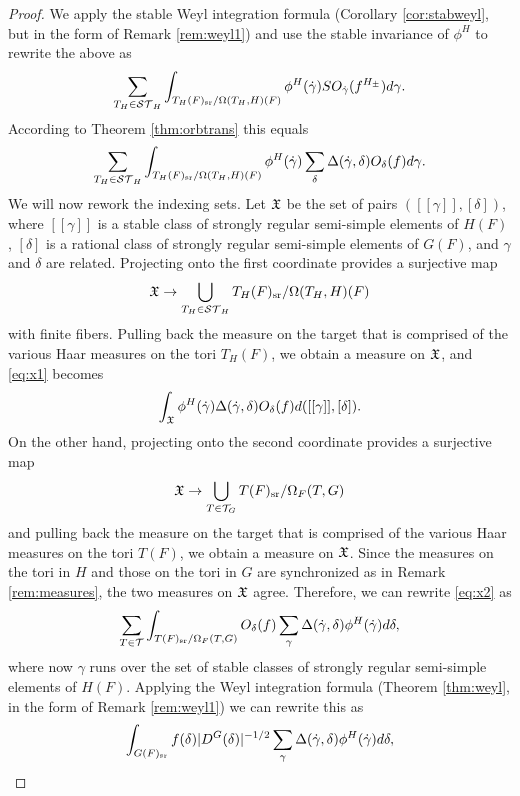 \documentclass{article}
\theoremstyle{definition}
\numberwithin{equation}{section}
\renewcommand{\-}{\hyp{}}
\begin{document}
\begin{proof}
	We apply the stable Weyl integration formula (Corollary \ref{cor:stabweyl}, but in the form of Remark \ref{rem:weyl1}) and use the stable invariance of $\phi^H$ to rewrite the above as
	\[ \sum_{T_H \in \mathcal{ST}_H} \int_{T_H(F)_{\textrm{sr}}/\Omega(T_H,H)(F)}\phi^H(\dot\gamma) SO_{\dot\gamma}(f^{H_\pm})d\gamma.\]
	According to Theorem \ref{thm:orbtrans} this equals
	\begin{equation} \label{eq:x1}
	\sum_{T_H \in \mathcal{ST}_H} \int_{T_H(F)_{\textrm{sr}}/\Omega(T_H,H)(F)}\phi^H(\dot\gamma)  \sum_\delta \Delta(\dot\gamma,\delta) O_\delta(f) d\gamma.
	\end{equation}
	We will now rework the indexing sets. Let $\mathfrak{X}$ be the set of pairs $([[\gamma]],[\delta])$, where $[[\gamma]]$ is a stable class of strongly regular semi-simple elements of $H(F)$, $[\delta]$ is a rational class of strongly regular semi-simple elements of $G(F)$, and $\gamma$ and $\delta$ are related. Projecting onto the first coordinate provides a surjective map
	\[ \mathfrak{X} \to \bigcup_{T_H \in \mathcal{ST}_H} T_H(F)_{\textrm{sr}}/\Omega(T_H,H)(F) \]
	with finite fibers. Pulling back the measure on the target that is comprised of the various Haar measures on the tori $T_H(F)$, we obtain a measure on $\mathfrak{X}$, and \eqref{eq:x1} becomes
	\begin{equation} \label{eq:x2}
	\int_{\mathfrak{X}} \phi^H(\dot\gamma) \Delta(\dot\gamma,\delta) O_\delta(f) d([[\gamma]],[\delta]).
	\end{equation}
	On the other hand, projecting onto the second coordinate provides a surjective map
	\[ \mathfrak{X} \to \bigcup_{T \in \mathcal{T}_G} T(F)_{\textrm{sr}}/\Omega_F(T,G) \]
	and pulling back the measure on the target that is comprised of the various Haar measures on the tori $T(F)$, we obtain a measure on $\mathfrak{X}$. Since the measures on the tori in $H$ and those on the tori in $G$ are synchronized as in Remark \ref{rem:measures}, the two measures on $\mathfrak{X}$ agree. Therefore, we can rewrite \eqref{eq:x2} as 
	\[ 
	\sum_{T \in \mathcal{T}} \int_{T(F)_{\textrm{sr}}/\Omega_F(T,G)}O_\delta(f) \sum_\gamma \Delta(\dot\gamma,\delta) \phi^H(\dot\gamma) d\delta,	
	\] 
	where now $\gamma$ runs over the set of stable classes of strongly regular semi-simple elements of $H(F)$. Applying the Weyl integration formula (Theorem \ref{thm:weyl}, in the form of Remark \ref{rem:weyl1}) we can rewrite this as 
	\begin{equation} \label{eq:x3}
	\int_{G(F)_{\textrm{sr}}}f(\delta) |D^G(\delta)|^{-1/2}\sum_\gamma \Delta(\dot\gamma,\delta) \phi^H(\dot\gamma) d\delta,
	\end{equation}

\end{proof}
\end{document}
